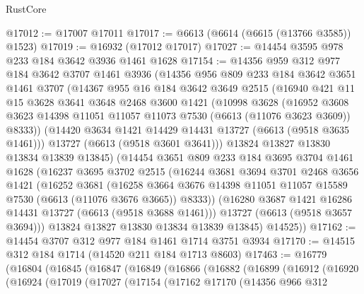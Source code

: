\begin{lexlean}{RustCore}
\begin{coremodule}
@17012 := @17007 @17011
@17017 := @6613 (@6614 (@6615 (@13766 @3585)) @1523)
@17019 := @16932 (@17012 @17017)
@17027 := @14454 @3595 @978 @233 @184 @3642 @3936 @1461 @1628
@17154 := @14356
    @959
    @312
    @977
    @184
    @3642
    @3707
    @1461
    @3936
    (@14356
      @956
      @809
      @233
      @184
      @3642
      @3651
      @1461
      @3707
      (@14367
        @955
        @16
        @184
        @3642
        @3649
        @2515
        (@16940
          @421
          @11
          @15
          @3628
          @3641
          @3648
          @2468
          @3600
          @1421
          (@10998
            @3628
            (@16952
              @3608
              @3623
              @14398
              @11051
              @11057
              @11073
              @7530
              (@6613 (@11076 @3623 @3609))
              @8333))
          (@14420 @3634 @1421 @14429 @14431 @13727 (@6613 (@9518 @3635 @1461)))
          @13727
          (@6613 (@9518 @3601 @3641)))
        @13824
        @13827
        @13830
        @13834
        @13839
        @13845)
      (@14454
        @3651
        @809
        @233
        @184
        @3695
        @3704
        @1461
        @1628
        (@16237
          @3695
          @3702
          @2515
          (@16244
            @3681
            @3694
            @3701
            @2468
            @3656
            @1421
            (@16252
              @3681
              (@16258
                @3664
                @3676
                @14398
                @11051
                @11057
                @15589
                @7530
                (@6613 (@11076 @3676 @3665))
                @8333))
            (@16280 @3687 @1421 @16286 @14431 @13727 (@6613 (@9518 @3688 @1461)))
            @13727
            (@6613 (@9518 @3657 @3694)))
          @13824
          @13827
          @13830
          @13834
          @13839
          @13845)
        @14525))
@17162 := @14454 @3707 @312 @977 @184 @1461 @1714 @3751 @3934
@17170 := @14515 @312 @184 @1714 (@14520 @211 @184 @1713 @8603)
@17463 := @16779
    (@16804
      (@16845
        (@16847
          (@16849
            (@16866
              (@16882
                (@16899
                  (@16912
                    (@16920
                      (@16924
                        (@17019
                          (@17027
                            (@17154
                              (@17162
                                @17170
                                (@14356
                                  @966
                                  @312

\end{coremodule}
\end{lexlean}
